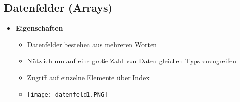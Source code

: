 \subsection{Datenfelder (Arrays)}
    \begin{itemize}
        \item \textbf{Eigenschaften}
            \begin{itemize}
                \item Datenfelder bestehen aus mehreren Worten 
                \item Nützlich um auf eine große Zahl von Daten gleichen Typs zuzugreifen
                \item Zugriff auf einzelne Elemente über Index
                \item[] \texttt{[image: datenfeld1.PNG]}
            \end{itemize} 


\end{itemize}
